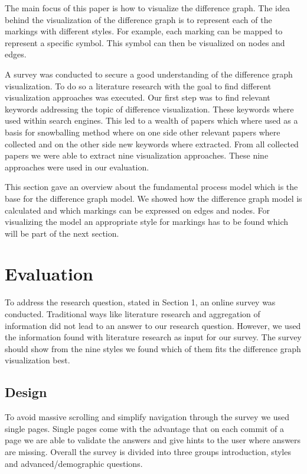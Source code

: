 \documentclass{llncs}
\begin{document}
The main  focus of this paper is how to visualize the difference graph. The idea behind the visualization of the difference graph is to represent each of the markings with different styles. For example, each marking can be mapped to represent a specific symbol. This symbol can then be visualized on nodes and edges.

A survey was conducted to secure a good understanding of the difference graph visualization. To do so a literature research with the goal to find different visualization approaches was executed. Our first step was to find relevant keywords addressing the topic of difference visualization. These keywords where used within search engines. This led to a wealth of papers which where used as a basis for snowballing method where on one side other relevant papers where collected and on the other side new keywords where extracted. From all collected papers we were able to extract nine visualization approaches. These nine approaches were used in our evaluation.

This section gave an overview about the fundamental process model which is the base for the difference graph model. We showed how the difference graph model is calculated and which markings can be expressed on edges and nodes. For visualizing the model an appropriate style for markings has to be found which will be part of the next section.

\section{Evaluation} %
\label{sec:Evaluation} %
To address the research question, stated in Section 1, an online survey was conducted. Traditional ways like literature research and aggregation of information did not lead to an answer to our research question. However, we used the information found with literature research as input for our survey. The survey should show from the nine styles we found which of them fits the difference graph visualization best.


\subsection{Design} %
\label{sec:Design}
To avoid massive scrolling and simplify navigation through the survey we used single pages. Single pages come with the advantage that on each commit of a page we are able to validate the answers and give hints to the user where answers are missing. Overall the survey is divided into three groups introduction, styles and advanced/demographic questions.
\end{document}

